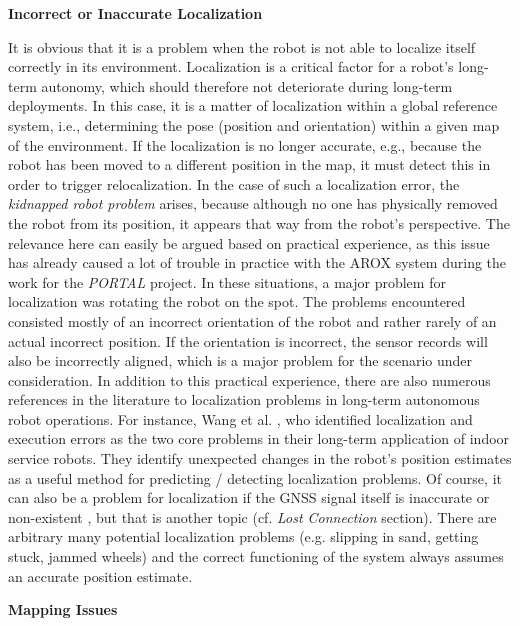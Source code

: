 \documentclass[english, master, utf8]{base/thesis_KBS}
\begin{document}
\noindent
\textbf{Incorrect or Inaccurate Localization}\newline

\noindent
It is obvious that it is a problem when the robot is not able to localize itself correctly in its environment.
Localization is a critical factor for a robot's long-term autonomy, which should therefore not deteriorate during long-term deployments. \cite{Hawes:2017}
In this case, it is a matter of localization within a global reference system, i.e., determining the pose (position and orientation) within a given map of the environment.
If the localization is no longer accurate, e.g., because the robot has been moved to a different position in the map, it must detect this in order to
trigger relocalization. In the case of such a localization error, the \textit{kidnapped robot problem} arises, because although no one has 
physically removed the robot from its position, it appears that way from the robot's perspective. \cite{Hertzberg:2012}
The relevance here can easily be argued based on practical experience, as this issue has already caused a lot of trouble in practice with the AROX system during 
the work for the \textit{PORTAL} project. In these situations, a major problem for localization was rotating the robot on the spot.
The problems encountered consisted mostly of an incorrect orientation of the robot and rather rarely of an actual incorrect position.
If the orientation is incorrect, the sensor records will also be incorrectly aligned, which is a major problem for the scenario under consideration.
In addition to this practical experience, there are also numerous references in the literature to localization problems in long-term autonomous robot operations. For instance,
Wang et al. \cite{Wang:2018}, who identified localization and execution errors as the two core problems in their long-term application of indoor service robots.
They identify unexpected changes in the robot's position estimates as a useful method for predicting / detecting localization problems.
Of course, it can also be a problem for localization if the GNSS signal itself is inaccurate or non-existent \cite{Churchill:2013}, but that is another topic (cf. \textit{Lost Connection} section).
There are arbitrary many potential localization problems (e.g. slipping in sand, getting stuck, jammed wheels) and the correct functioning of the system always assumes an accurate
position estimate. \cite{Goldberg:2002}\newline

\noindent
\textbf{Mapping Issues}\newline
\end{document}
